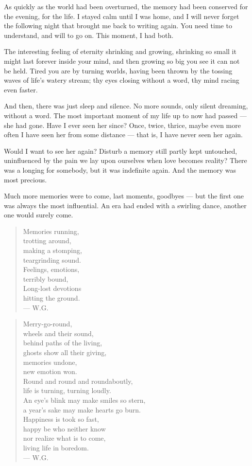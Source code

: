 As quickly as the world had been overturned, the memory had been conserved for the evening, for the life. I stayed calm until I was home, and I will never forget the following night that brought me back to writing again. You need time to understand, and will to go on. This moment, I had both.

The interesting feeling of eternity shrinking and growing, shrinking so small it might last forever inside your mind, and then growing so big you see it can not be held. 
Tired you are by turning worlds, having been thrown by the tossing waves of life's watery stream; thy eyes closing without a word, thy mind racing even faster.

And then, there was just sleep and silence. No more sounds, only silent dreaming, without a word. The most important moment of my life up to now had passed --- she had gone. Have I ever seen her since? 
Once, twice, thrice, maybe even more often I have seen her from some distance --- that is, I have never seen her again.

Would I want to see her again? Disturb a memory still partly kept untouched, uninfluenced by the pain we lay upon ourselves when love becomes reality? There was a longing for somebody, but it was indefinite again. And the memory was most precious.

Much more memories were to come, last moments, goodbyes --- but the first one was always the most influential.
An era had ended with a swirling dance, another one would surely come.

\begin{verse}
Memories running, \\
trotting around, \\
making a stomping, \\
teargrinding sound. \\
Feelings, emotions, \\
terribly bound, \\
Long-lost devotions \\
hitting the ground. \\
--- W.G.
\end{verse}

\begin{verse}
Merry-go-round, \\
wheels and their sound, \\
behind paths of the living, \\
ghosts show all their giving, \\
memories undone, \\
new emotion won. \\
Round and round and roundaboutly, \\
life is turning, turning loudly. \\
An eye's blink may make smiles so stern, \\
a year's sake may make hearts go burn. \\
Happiness is took so fast, \\
happy be who neither know\\
nor realize what is to come, \\
living life in boredom. \\
--- W.G.
\end{verse}

